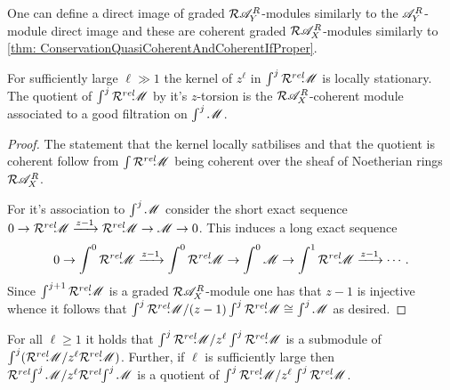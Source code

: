 One can define a direct image of graded $\mathcal{R}\mathscr{A}_Y^R$-modules similarly to the $\mathscr{A}_Y^R$-module direct image and these are coherent graded $\mathcal{R}\mathscr{A}_X^R$-modules similarly to \cref{thm: ConservationQuasiCoherentAndCoherentIfProper}. 

\begin{lemma}
  For sufficiently large $\ell \gg 1$ the kernel of $z^\ell$ in $\int^j \mathcal{R}^{rel}\mkern-5mu \mathscr{M}$ is locally stationary. The quotient of $\int^j \mathcal{R}^{rel}\mkern-5mu \mathscr{M}$ by it's $z$-torsion is the $\mathcal{R} \mathscr{A}_X^R$-coherent module associated to a good filtration on $\int^j \mathscr{M}$.
\end{lemma}
\begin{proof}
    The statement that the kernel locally satbilises and that the quotient is coherent follow from $\int \mathcal{R}^{rel}\mkern-5mu \mathscr{M}$ being coherent over the sheaf of Noetherian rings $\mathcal{R}\mathscr{A}_X^R$.

    For it's association to $\int^j \mathscr{M}$ consider the short exact sequence $0\to \mathcal{R}^{rel}\mkern-5mu \mathscr{M} \xrightarrow{z-1} \mathcal{R}^{rel}\mkern-5mu \mathscr{M} \to \mathscr{M} \to 0$. This induces a long exact sequence
    $$0 \to \int^0 \mathcal{R}^{rel}\mkern-5mu \mathscr{M} \xrightarrow{z-1} \int^0 \mathcal{R}^{rel}\mkern-5mu \mathscr{M} \to \int^0 \mathscr{M} \to \int^1 \mathcal{R}^{rel}\mkern-5mu \mathscr{M} \xrightarrow{z-1}\cdots. $$
    Since $\int^{j+1} \mathcal{R}^{rel}\mkern-5mu \mathscr{M}$ is a graded $\mathcal{R}\mathscr{A}_X^R$-module one has that $z-1$ is injective whence it follows that $\int^j \mathcal{R}^{rel}\mkern-5mu \mathscr{M} / (z-1)\int^j \mathcal{R}^{rel}\mkern-5mu \mathscr{M} \cong \int^j \mathscr{M}$ as desired.
\end{proof}
\begin{corollary}
    For all $\ell \geq 1$ it holds that $\int^j \mathcal{R}^{rel}\mkern-5mu\mathscr{M} / z^\ell\int^j \mathcal{R}^{rel}\mkern-5mu \mathscr{M}$ is a submodule of $\int^j (\mathcal{R}^{rel}\mkern-5mu \mathscr{M} / z^\ell \mathcal{R}^{rel}\mkern-5mu \mathscr{M})$. Further, if $\ell$ is sufficiently large then $\mathcal{R}^{rel}\mkern-5mu \int^j\mathscr{M} / z^\ell \mathcal{R}^{rel}\mkern-5mu \int^j \mathscr{M}$ is a quotient of $\int^j \mathcal{R}^{rel}\mkern-5mu \mathscr{M} / z^\ell \int^j \mathcal{R}^{rel}\mkern-5mu \mathscr{M}$.
\end{corollary}
